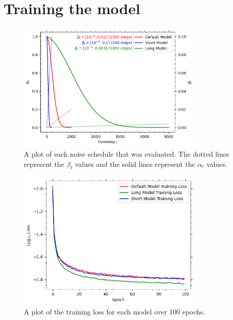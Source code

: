 
\section{Training the model}\label{sec:q1bc}
\begin{figure}[t]
    \centering
    \includegraphics[width=0.8\textwidth]{figures/q1b_noise_schedules}
    \caption{A plot of each noise schedule that was evaluated.
        The dotted lines represent the $\beta_{t}$ values and the solid lines represent the $\alpha_t$ values.}
    \label{fig:q1b_noise_schedules}
\end{figure}

\begin{figure}[t]
    \centering
    \includegraphics[width=0.8\textwidth]{figures/q1b_training_loss}
    \caption{A plot of the training loss for each model over 100 epochs.}
    \label{fig:q1b_training_loss}
\end{figure}

